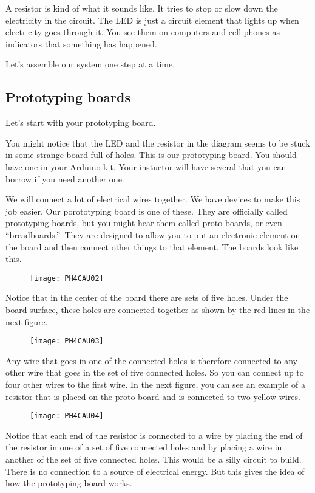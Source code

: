 A resistor is kind of what it sounds like. It tries to stop or slow down the
electricity in the circuit. The LED is just a circuit element that lights up
when electricity goes through it. You see them on computers and cell phones
as indicators that something has happened.

Let's assemble our system one step at a time.

\subsection{Prototyping boards}

Let's start with your prototyping board.

You might notice that the LED and the resistor in the diagram seems to be
stuck in some strange board full of holes. This is our prototyping board.
You should have one in your Arduino kit. Your instuctor will have several
that you can borrow if you need another one.

We will connect a lot of electrical wires together. We have devices to make
this job easier. Our porototyping board is one of these. They are officially
called prototyping boards, but you might hear them called proto-boards, or
even \textquotedblleft breadboards.\textquotedblright\ They are designed to
allow you to put an electronic element on the board and then connect other
things to that element. The boards look like this. \begin{figure}[h!]
\texttt{[image: PH4CAU02]}
\end{figure}

Notice that in the center of the board there are sets of five holes. Under
the board surface, these holes are connected together as shown by the red
lines in the next figure. \begin{figure}[h!]
\texttt{[image: PH4CAU03]}
\end{figure} Any wire that goes in one of the
connected holes is therefore connected to any other wire that goes in the
set of five connected holes. So you can connect up to four other wires to
the first wire. In the next figure, you can see an example of a resistor
that is placed on the proto-board and is connected to two yellow wires. 
\begin{figure}[h!]
\texttt{[image: PH4CAU04]}
\end{figure}Notice that each end of the
resistor is connected to a wire by placing the end of the resistor in one of
a set of five connected holes and by placing a wire in another of the set of
five connected holes. This would be a silly circuit to build. There is no
connection to a source of electrical energy. But this gives the idea of how
the prototyping board works.

